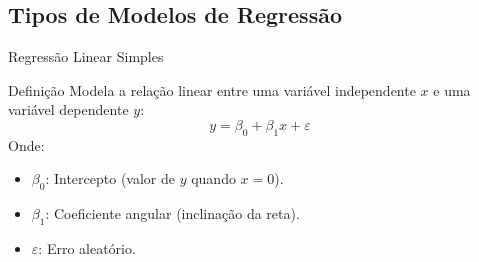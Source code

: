 \documentclass{beamer}
\begin{document}
\subsection{Tipos de Modelos de Regressão}

\begin{frame}{Regressão Linear Simples}
\footnotesize
  \begin{block}{Definição}
    Modela a relação linear entre uma variável independente \( x \) e uma variável dependente \( y \):
    \[
    y = \beta_0 + \beta_1 x + \varepsilon
    \]
    Onde:
    \begin{itemize}
      \item \( \beta_0 \): Intercepto (valor de \( y \) quando \( x = 0 \)).
      \item \( \beta_1 \): Coeficiente angular (inclinação da reta).
      \item \( \varepsilon \): Erro aleatório.
    \end{itemize}
  \end{block}
    \centering
\vspace*{-0.1cm}
\end{frame}
\end{document}
